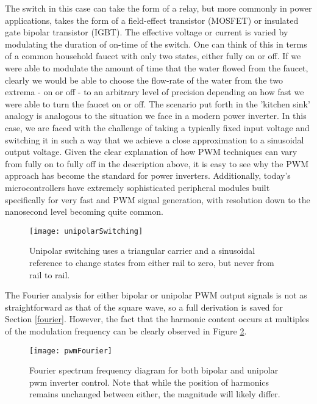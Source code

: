The switch in this case can take the form of a relay, but more commonly in power applications, takes the form of a field-effect transistor (MOSFET) or insulated gate bipolar transistor (IGBT). The effective voltage or current is varied by modulating the duration of on-time of the switch. One can think of this in terms of a common household faucet with only two states, either fully on or off. If we were able to modulate the amount of time that the water flowed from the faucet, clearly we would be able to choose the flow-rate of the water from the two extrema - on or off - to an arbitrary level of precision depending on how fast we were able to turn the faucet on or off. The scenario put forth in the 'kitchen sink' analogy is analogous to the situation we face in a modern power inverter. In this case, we are faced with the challenge of taking a typically fixed input voltage and switching it in such a way that we achieve a close approximation to a sinusoidal output voltage. Given the clear explanation of how PWM techniques can vary from fully on to fully off in the description above, it is easy to see why the PWM approach has become the standard for power inverters. Additionally, today's microcontrollers have extremely sophisticated peripheral modules built specifically for very fast and PWM signal generation, with resolution down to the nanosecond level becoming quite common. 

\begin{figure}[h]
\centering
\texttt{[image: unipolarSwitching]}
\caption{Unipolar switching uses a triangular carrier and a sinusoidal reference to change states from either rail to zero, but never from rail to rail.}
\label{unipolar}
\end{figure}

The Fourier analysis for either bipolar or unipolar PWM output signals is not as straightforward as that of the square wave, so a full derivation is saved for Section \ref{fourier}. However, the fact that the harmonic content occurs at multiples of the modulation frequency can be clearly observed in Figure \ref{pwmFourier}. 

\begin{figure}[h]
\centering
\texttt{[image: pwmFourier]}
\caption{Fourier spectrum frequency diagram for both bipolar and unipolar pwm inverter control. Note that while the position of harmonics remains unchanged between either, the magnitude will likely differ.}
\label{pwmFourier}
\end{figure}

